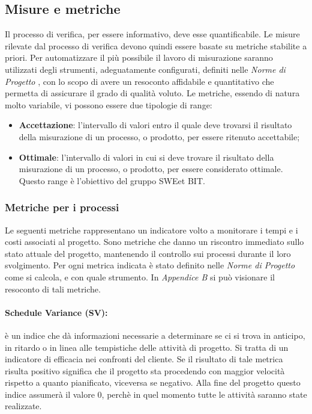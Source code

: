 \subsection{Misure e metriche}
Il processo di verifica, per essere informativo, deve esse quantificabile. Le misure rilevate
dal processo di verifica devono quindi essere basate su metriche stabilite a priori. Per automatizzare il più possibile il lavoro di misurazione saranno utilizzati degli strumenti, adeguatamente configurati, definiti nelle \emph{Norme di Progetto \VersioneNP{}}, con lo scopo di avere un resoconto affidabile e quantitativo che permetta di assicurare il grado di qualità voluto.
Le metriche, essendo di natura molto variabile, vi possono essere due tipologie di range:
\begin{itemize}
\item \textbf{Accettazione}: l'intervallo di valori entro il quale deve trovarsi il risultato della misurazione di un processo, o prodotto, per essere ritenuto accettabile;
\item \textbf{Ottimale}: l'intervallo di valori in cui si deve trovare il risultato della misurazione di un processo, o prodotto, per essere considerato ottimale.
    Questo range è l'obiettivo del gruppo SWEet BIT.
\end{itemize}

\subsubsection{Metriche per i processi}
Le seguenti metriche rappresentano un indicatore volto a monitorare i tempi e i costi associati al progetto. Sono metriche che danno un riscontro immediato sullo stato attuale del progetto, mantenendo il controllo sui processi durante il loro svolgimento.\linebreak
Per ogni metrica indicata è stato definito nelle \emph{Norme di Progetto \VersioneNP{}} come si calcola, e con quale strumento. In \emph{Appendice B} si può visionare il resoconto di tali metriche.

\paragraph{Schedule Variance (SV):} è un indice che dà informazioni necessarie a determinare se ci si trova in anticipo, in ritardo o in linea alle tempistiche delle attività di progetto. Si tratta di un indicatore di efficacia nei confronti del cliente. Se il risultato di tale metrica risulta positivo significa che il progetto sta procedendo con maggior velocità rispetto a quanto pianificato, viceversa
se negativo. Alla fine del progetto questo indice assumerà il valore 0, perchè in quel momento tutte le attività saranno state realizzate.
      
